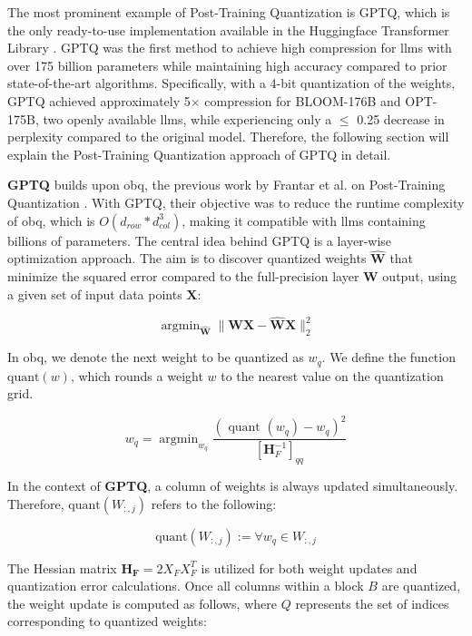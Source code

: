 The most prominent example of Post-Training Quantization is GPTQ, which is the only ready-to-use implementation available in the Huggingface Transformer Library \cite{noauthor_quantize_nodate}. GPTQ was the first method to achieve high compression for \gls{llm}s with over 175 billion parameters while maintaining high accuracy compared to prior state-of-the-art algorithms. Specifically, with a 4-bit quantization of the weights, GPTQ achieved approximately 5$\times$ compression for BLOOM-176B and OPT-175B, two openly available \gls{llm}s, while experiencing only a $\leq$ 0.25 decrease in perplexity compared to the original model. Therefore, the following section will explain the Post-Training Quantization approach of GPTQ in detail.

\textbf{GPTQ} builds upon \gls{obq}, the previous work by Frantar et al. on Post-Training Quantization \cite{frantar_optimal_2023}. With GPTQ, their objective was to reduce the runtime complexity of \gls{obq}, which is $O(d_{row} * d_{col}^{3})$, making it compatible with \gls{llm}s containing billions of parameters. The central idea behind GPTQ is a layer-wise optimization approach. The aim is to discover quantized weights $\widehat{\mathbf{W}}$ that minimize the squared error compared to the full-precision layer $\mathbf{W}$ output, using a given set of input data points $\mathbf{X}$:

\begin{equation}
    \operatorname{argmin}_{\widehat{\mathbf{W}}}\|\mathbf{W} \mathbf{X}-\widehat{\mathbf{W}} \mathbf{X}\|_2^2
\end{equation}

In \gls{obq}, we denote the next weight to be quantized as $w_q$. We define the function $\text{quant}(w)$, which rounds a weight $w$ to the nearest value on the quantization grid.

\begin{equation}
    w_q=\operatorname{argmin}_{w_q} \frac{\left(\text { quant }\left(w_q\right)-w_q\right)^2}{\left[\mathbf{H}_F^{-1}\right]_{q q}}
\end{equation}

In the context of \textbf{GPTQ}, a column of weights is always updated simultaneously. Therefore, $\text{quant}(W_{:,j})$ refers to the following:

\begin{equation}
    \text{quant}(W_{:,j}) := \operatorname \forall w_q \in W_{:,j} 
\end{equation}

The Hessian matrix $\mathbf{H_F} = 2X_FX_F^T$ is utilized for both weight updates and quantization error calculations. Once all columns within a block $B$ are quantized, the weight update is computed as follows, where $Q$ represents the set of indices corresponding to quantized weights:

